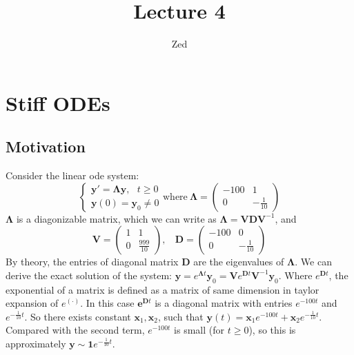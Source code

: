 \documentclass[a4paper, 11pt]{article}
\title{\textbf{Lecture 4}}
\author{Zed}
\begin{document}
\maketitle
\section{Stiff ODEs}
\subsection{Motivation}
Consider the linear ode system:
\begin{equation}
	\begin{cases}
		\bm{y}' = \bm{\Lambda} \bm{y}, ~~~t\geq 0\\
		\bm{y}(0) = \bm{y}_0 \ne 0
	\end{cases}
	\text{where}~\bm{\Lambda} = 
	\begin{pmatrix}
		-100 & 1\\
		0 & -\frac{1}{10}
	\end{pmatrix}
\end{equation}
$\bm{\Lambda}$ is a diagonizable matrix, which we can write as $\bm{\Lambda} = \bm{V} \bm{D} \bm{V}^{-1}$, and
$$
\bm{V} = \begin{pmatrix}1 & 1 \\ 0 & \frac{999}{10}\end{pmatrix},~~~~\bm{D}=\begin{pmatrix}-100 & 0 \\ 0 &-\frac{1}{10}\end{pmatrix}
$$
By theory, the entries of diagonal matrix $\bm{D}$ are the eigenvalues of $\bm{\Lambda}$. We can derive the exact solution of the system: $\bm{y} = e^{\bm{\Lambda}t} \bm{y}_0 = \bm{V} e^{\bm{D}t} \bm{V}^{-1} \bm{y}_0$. Where $e^{\bm{D}t}$, the exponential of a matrix is defined as a matrix of same dimension in taylor expansion of $e^{(\cdot)}$. In this case $\bm{e}^{\bm{D}t}$ is a diagonal matrix with entries $e^{-100t}$ and $e^{-\frac{1}{10}t}$. So there exists constant $\bm{x}_1, \bm{x}_2$, such that $\bm{y}(t) = \bm{x}_1 e^{-100t} + \bm{x}_2 e^{-\frac{1}{10} t}$. Compared with the second term, $e^{-100t}$ is small (for $t\geq 0$), so this is approximately $\bm{y} \sim \bm{1}e^{-\frac{1}{10}t}$.
\end{document}
